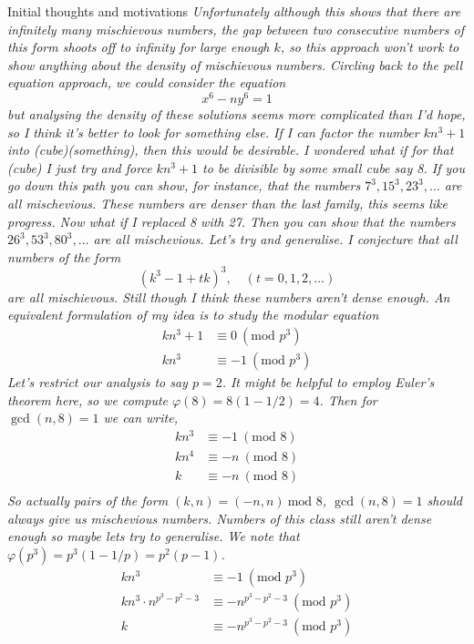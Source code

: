 \documentclass{article}
\begin{document}
\begin{hint}{Initial thoughts and motivations}
\textit{
Unfortunately although this shows that there are infinitely many
mischievous numbers, the gap between two consecutive numbers of this form
shoots off to infinity for large enough $k$, so this approach won't work
to show anything about the density of mischievous numbers. Circling back
to the pell equation approach, we could consider the equation
}
$$
x^6 - n y^6 = 1
$$
\textit{but analysing the density of these solutions seems more complicated
than I'd hope, so I think it's better to look for something else.
If I can factor the number $kn^3 + 1$ into (cube)(something), then
this would be desirable. I wondered what if for that (cube) I just try and
force $kn^3 + 1$ to be divisible by some small cube say 8. If you go down
this path you can show, for instance, that the numbers
$7^3, 15^3, 23^3, \ldots$ are
all mischevious. These numbers are denser than the last family,
this seems like progress. Now what if I replaced 8 with 27. Then you can
show that the numbers $26^3, 53^3, 80^3, \ldots$ are all mischevious.
Let's try and generalise. I conjecture that all numbers of the form
}
$$
(k^3 - 1 + tk)^3, \quad (t = 0,1,2,\ldots)
$$
\textit{
are all mischievous. Still though I think these numbers aren't dense enough.
An equivalent formulation of my idea is to study the modular equation
}
\[
\begin{aligned}
kn^3 + 1 &\equiv 0 \ (\text{mod } p^3) \\
kn^3 &\equiv -1 \ (\text{mod } p^3)
\end{aligned}
\]
\textit{Let's restrict our analysis to say $p=2$. It might be helpful to
employ Euler's theorem here, so we compute $\varphi(8) = 8(1 - 1/2) = 4$.
Then for $\gcd(n, 8) = 1$ we can write,}
\[
\begin{aligned}
kn^3 &\equiv -1 \ (\text{mod } 8) \\
kn^4 &\equiv -n \ (\text{mod } 8) \\
k &\equiv -n \ (\text{mod } 8) \\
\end{aligned}
\]
\textit{So actually pairs of the form $(k, n) = (-n, n) \ \text{mod } 8$,
$\gcd(n,8) = 1$ should always give us mischevious numbers. Numbers of this
class still aren't dense enough so maybe lets try to generalise.
We note that $\varphi(p^3) = p^3(1-1/p) = p^2(p-1)$.
}
\[
\begin{aligned}
kn^3 &\equiv -1 \ (\text{mod } p^3) \\
kn^3\cdot n^{p^3 - p^2 - 3} &\equiv -n^{p^3 - p^2 - 3} \ (\text{mod } p^3)\\
k &\equiv -n^{p^3 - p^2 - 3} \ (\text{mod } p^3)\\

\end{aligned}\]
\end{hint}
\end{document}
